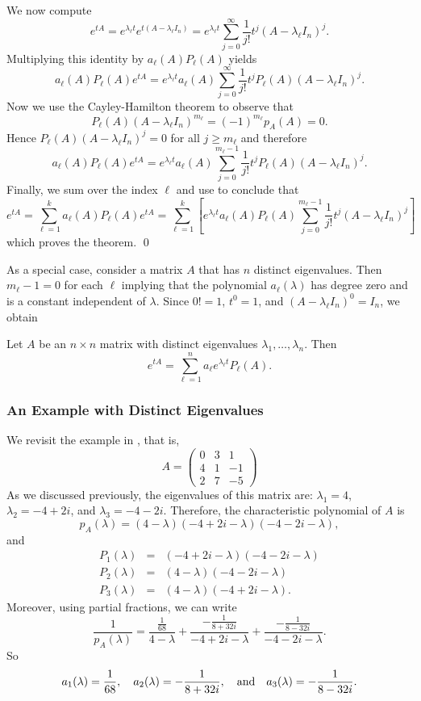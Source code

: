 We now compute 
\[
e^{tA}   =  e^{\lambda_\ell t}e^{t(A-\lambda_\ell I_n)} =  
e^{\lambda_\ell t}\sum_{j=0}^\infty\frac{1}{j!}t^j(A-\lambda_\ell I_n)^j.
\]
Multiplying this identity by $a_\ell(A)P_\ell(A)$ yields
\[
a_\ell(A)P_\ell(A)e^{tA} = e^{\lambda_\ell t}a_\ell(A)
\sum_{j=0}^\infty\frac{1}{j!}t^jP_\ell(A)(A-\lambda_\ell I_n)^j.
\]
Now we use the Cayley-Hamilton theorem to observe that 
\[
P_\ell(A)(A-\lambda_\ell I_n)^{m_\ell} = (-1)^{m_\ell}p_A(A) = 0.
\]
Hence $P_\ell(A)(A-\lambda_\ell I_n)^j=0$ for all $j\ge m_\ell$
and therefore
\[
a_\ell(A)P_\ell(A)e^{tA} = e^{\lambda_\ell t}a_\ell(A)
\sum_{j=0}^{m_\ell-1}\frac{1}{j!}t^jP_\ell(A)(A-\lambda_\ell I_n)^j.
\]
Finally, we sum over the index $\ell$ and use  to conclude that
\[
e^{tA} = \sum_{\ell=1}^ka_\ell(A)P_\ell(A)e^{tA} = 
\sum_{\ell=1}^k\left[ e^{\lambda_\ell t}a_\ell(A)P_\ell(A)
\sum_{j=0}^{m_\ell-1}\frac{1}{j!}t^j(A-\lambda_\ell I_n)^j \right]
\]
which proves the theorem.  \qed  

As a special case, consider a matrix $A$ that has $n$ distinct
eigenvalues. Then $m_\ell-1=0$ for each $\ell$ implying that the polynomial
$a_\ell(\lambda)$ has degree zero and is a constant independent of $\lambda$. 
Since $0!=1$, $t^0=1$, and $(A-\lambda_\ell I_n)^0=I_n$, we obtain
\begin{cor} \label{T:etA0}
Let $A$ be an $n\times n$ matrix with distinct eigenvalues
$\lambda_1,\ldots,\lambda_n$. Then
\[
e^{tA} = \sum_{\ell=1}^n a_\ell e^{\lambda_\ell t} P_\ell(A).
\]
\end{cor}

\subsubsection*{An Example with Distinct Eigenvalues}

We revisit the example in , that is, 
\[
A = \left(\begin{array}{rrr}
     0  &  3  &  1\\
     4  &  1  & -1\\
     2  &  7  & -5
\end{array}\right)
\]
As we discussed previously, the eigenvalues of this matrix are:
$\lambda_1=4$, $\lambda_2=-4+2i$, and $\lambda_3=-4-2i$.
Therefore, the characteristic 
polynomial of $A$ is
\[
p_A(\lambda) = (4-\lambda)(-4+2i-\lambda)(-4-2i-\lambda),
\]
and
\begin{eqnarray*}
P_1(\lambda) & = & (-4+2i-\lambda)(-4-2i-\lambda) \\
P_2(\lambda)& = & (4-\lambda)(-4-2i-\lambda)\\  
P_3(\lambda) & = & (4-\lambda)(-4+2i-\lambda).
\end{eqnarray*}
Moreover, using partial fractions, 
we can write
\[
\frac{1}{p_A(\lambda)} = \frac{\frac{1}{68}}{4-\lambda} + 
\frac{-\frac{1}{8+32i}}{-4+2i-\lambda}
+ \frac{-\frac{1}{8-32i}}{-4-2i-\lambda}.
\]
So
\[
a_1(\lambda)=\frac{1}{68}, \quad a_2(\lambda)=-\frac{1}{8+32i},
 \quad\mbox{and}\quad a_3(\lambda)=-\frac{1}{8-32i}.
\]

